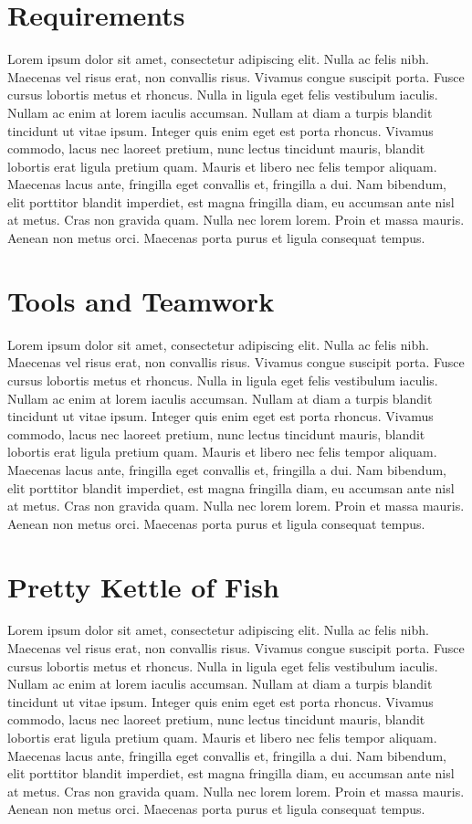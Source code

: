 \documentclass[12pt]{article}
\begin{document}
  \section{Requirements}
    Lorem ipsum dolor sit amet, consectetur adipiscing elit. Nulla ac felis nibh. Maecenas vel risus erat, non convallis risus. Vivamus congue suscipit porta. Fusce cursus lobortis metus et rhoncus. Nulla in ligula eget felis vestibulum iaculis. Nullam ac enim at lorem iaculis accumsan. Nullam at diam a turpis blandit tincidunt ut vitae ipsum. Integer quis enim eget est porta rhoncus. Vivamus commodo, lacus nec laoreet pretium, nunc lectus tincidunt mauris, blandit lobortis erat ligula pretium quam. Mauris et libero nec felis tempor aliquam. Maecenas lacus ante, fringilla eget convallis et, fringilla a dui. Nam bibendum, elit porttitor blandit imperdiet, est magna fringilla diam, eu accumsan ante nisl at metus. Cras non gravida quam. Nulla nec lorem lorem. Proin et massa mauris. Aenean non metus orci. Maecenas porta purus et ligula consequat tempus.

  \section{Tools and Teamwork}
    Lorem ipsum dolor sit amet, consectetur adipiscing elit. Nulla ac felis nibh. Maecenas vel risus erat, non convallis risus. Vivamus congue suscipit porta. Fusce cursus lobortis metus et rhoncus. Nulla in ligula eget felis vestibulum iaculis. Nullam ac enim at lorem iaculis accumsan. Nullam at diam a turpis blandit tincidunt ut vitae ipsum. Integer quis enim eget est porta rhoncus. Vivamus commodo, lacus nec laoreet pretium, nunc lectus tincidunt mauris, blandit lobortis erat ligula pretium quam. Mauris et libero nec felis tempor aliquam. Maecenas lacus ante, fringilla eget convallis et, fringilla a dui. Nam bibendum, elit porttitor blandit imperdiet, est magna fringilla diam, eu accumsan ante nisl at metus. Cras non gravida quam. Nulla nec lorem lorem. Proin et massa mauris. Aenean non metus orci. Maecenas porta purus et ligula consequat tempus.

  \section{Pretty Kettle of Fish}
    Lorem ipsum dolor sit amet, consectetur adipiscing elit. Nulla ac felis nibh. Maecenas vel risus erat, non convallis risus. Vivamus congue suscipit porta. Fusce cursus lobortis metus et rhoncus. Nulla in ligula eget felis vestibulum iaculis. Nullam ac enim at lorem iaculis accumsan. Nullam at diam a turpis blandit tincidunt ut vitae ipsum. Integer quis enim eget est porta rhoncus. Vivamus commodo, lacus nec laoreet pretium, nunc lectus tincidunt mauris, blandit lobortis erat ligula pretium quam. Mauris et libero nec felis tempor aliquam. Maecenas lacus ante, fringilla eget convallis et, fringilla a dui. Nam bibendum, elit porttitor blandit imperdiet, est magna fringilla diam, eu accumsan ante nisl at metus. Cras non gravida quam. Nulla nec lorem lorem. Proin et massa mauris. Aenean non metus orci. Maecenas porta purus et ligula consequat tempus.
\end{document}
